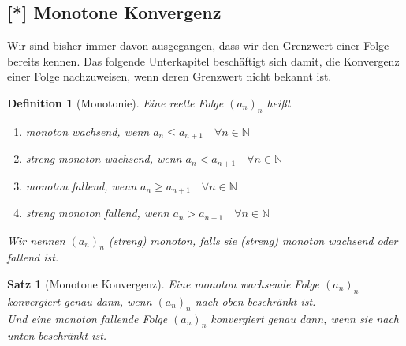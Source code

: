 \documentclass[11pt, twoside, a4paper]{article}
\theoremstyle{plain}
\newtheorem{definition}[blockelement]{Definition}
\newtheorem{satz}[blockelement]{Satz}
\newcommand{\naturalnumbers}{\mathbb{N}}
\begin{document}
    \subsection{[*] Monotone Konvergenz}

    Wir sind bisher immer davon ausgegangen, dass wir den Grenzwert einer Folge bereits kennen. Das folgende Unterkapitel beschäftigt sich damit, die Konvergenz einer Folge nachzuweisen, wenn deren Grenzwert nicht bekannt ist.

    \begin{definition}[Monotonie]
        Eine reelle Folge $(a_n)_n$ heißt
        \begin{enumerate}[label=(\roman*)]
            \item monoton wachsend, wenn $a_n \leq a_{n+1}\quad\forall n\in\naturalnumbers$
            \item streng monoton wachsend, wenn $a_n < a_{n+1}\quad\forall n\in\naturalnumbers$
            \item monoton fallend, wenn $a_n \geq a_{n+1}\quad\forall n\in\naturalnumbers$
            \item streng monoton fallend, wenn $a_n > a_{n+1}\quad\forall n\in\naturalnumbers$
        \end{enumerate}
        \noindent Wir nennen $(a_n)_n$ (streng) monoton, falls sie (streng) monoton wachsend oder fallend ist.
    \end{definition}

    \begin{satz}[Monotone Konvergenz]
        \label{satz:monoton-konv}
        Eine monoton wachsende Folge $(a_n)_n$ konvergiert genau dann, wenn $(a_n)_n$ nach oben beschränkt ist.\\
        Und eine monoton fallende Folge $(a_n)_n$ konvergiert genau dann, wenn sie nach unten beschränkt ist.
    \end{satz}

    \newpage
\end{document}
